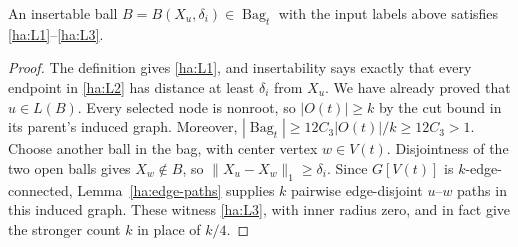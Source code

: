 \begin{lemma}\label{ha:input-valid}
An insertable ball $B=B(X_u,\delta_i)\in\operatorname{Bag}_t$
with the input labels above satisfies \ref{ha:L1}--\ref{ha:L3}.
\end{lemma}
\begin{proof}
The definition gives \ref{ha:L1}, and insertability says exactly that
every endpoint in \ref{ha:L2} has distance at least $\delta_i$ from
$X_u$.  We have already proved that $u\in L(B)$.
Every selected node is nonroot, so $|O(t)|\ge k$ by the cut bound
in its parent's induced graph.  Moreover,
$|\operatorname{Bag}_t|\ge12C_3|O(t)|/k\ge12C_3>1$.
Choose another ball in the bag, with center vertex $w\in V(t)$.
Disjointness of the two open balls gives $X_w\notin B$, so
$\|X_u-X_w\|_1\ge\delta_i$.  Since $G[V(t)]$ is
$k$-edge-connected, Lemma~\ref{ha:edge-paths} supplies
$k$ pairwise edge-disjoint $u$--$w$ paths in this induced graph.
These witness \ref{ha:L3}, with inner radius zero, and in fact give
the stronger count $k$ in place of $k/4$.
\end{proof}
